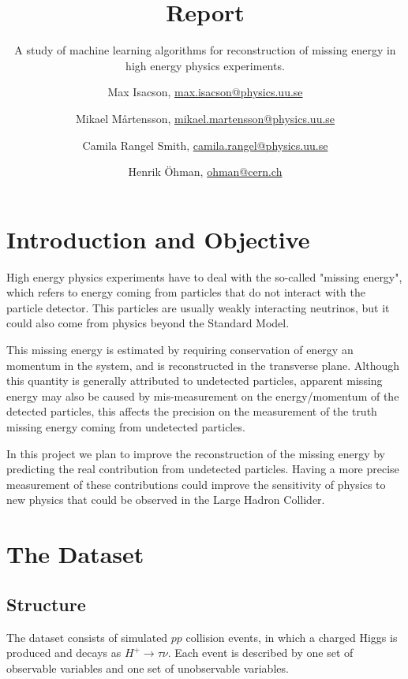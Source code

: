 \documentclass{scrartcl}
\title{Report}
\subtitle{A study of machine learning algorithms for reconstruction of missing energy in high energy physics experiments.}
\author{
  Max Isacson, \url{max.isacson@physics.uu.se}
  \and
  Mikael M\aa rtensson, \url{mikael.martensson@physics.uu.se}
  \and
  Camila Rangel Smith, \url{camila.rangel@physics.uu.se}
  \and
  Henrik Öhman, \url{ohman@cern.ch}
}
\begin{document}
\maketitle


\section{Introduction and Objective}

High energy physics experiments have to deal with the so-called "missing energy", which refers to energy coming from particles that do not interact with the particle detector. This particles are usually weakly interacting neutrinos, but it could also come from physics beyond the Standard Model.

This missing energy is estimated by requiring conservation of energy an momentum in the system, and is reconstructed in the transverse plane.  Although this quantity is generally attributed to undetected particles, apparent missing energy may also be caused by mis-measurement on the energy/momentum of the detected particles, this affects the precision on the measurement of the truth missing energy coming from undetected particles. 

In this project we plan to improve the reconstruction of the missing energy by predicting the real contribution from undetected particles. Having a more precise measurement of these contributions could improve the sensitivity of physics to new physics that could be observed in the Large Hadron Collider. 

\section{The Dataset}
\subsection{Structure}
The dataset consists of simulated $pp$ collision events, in which a charged Higgs is produced and decays as $H^+\to\tau\nu$. Each event is described by one set of observable variables and one set of unobservable variables.
\end{document}
